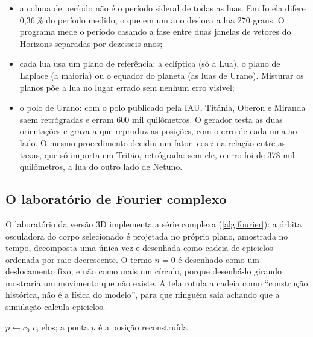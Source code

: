 \begin{itemize}
  \item a coluna de período não é o período sideral de todas as luas. Em Io ela difere 0,36\,\% do período medido, o que em um ano desloca a lua 270 graus. O programa mede o período casando a fase entre duas janelas de vetores do Horizons separadas por dezesseis anos;
  \item cada lua usa um plano de referência: a eclíptica (só a Lua), o plano de Laplace (a maioria) ou o equador do planeta (as luas de Urano). Misturar os planos põe a lua no lugar errado sem nenhum erro visível;
  \item o polo de Urano: com o polo publicado pela IAU, Titânia, Oberon e Miranda saem retrógradas e erram 600 mil quilômetros. O gerador testa as duas orientações e grava a que reproduz as posições, com o erro de cada uma ao lado. O mesmo procedimento decidiu um fator $\cos i$ na relação entre as taxas, que só importa em Tritão, retrógrada: sem ele, o erro foi de 378 mil quilômetros, a lua do outro lado de Netuno.
\end{itemize}

\subsection{O laboratório de Fourier complexo}

O laboratório da versão 3D implementa a série complexa (\autoref{alg:fourier}): a órbita osculadora do corpo selecionado é projetada no próprio plano, amostrada no tempo, decomposta uma única vez e desenhada como cadeia de epiciclos ordenada por raio decrescente. O termo $n=0$ é desenhado como um deslocamento fixo, e não como mais um círculo, porque desenhá-lo girando mostraria um movimento que não existe. A tela rotula a cadeia como ``construção histórica, não é a física do modelo'', para que ninguém saia achando que a simulação calcula epiciclos.

\begin{algorithm}[htb]
  \caption{Coeficientes de Fourier e cadeia de epiciclos}\label{alg:fourier}
  \KwIn{elementos $a$, $e$; número de amostras $A$; harmônicos $N$ com $2N < A$; instante $t\in[0,1)$}
  $p \leftarrow c_0$
  \Return $c$, elos; a ponta $p$ é a posição reconstruída\;
\end{algorithm}


